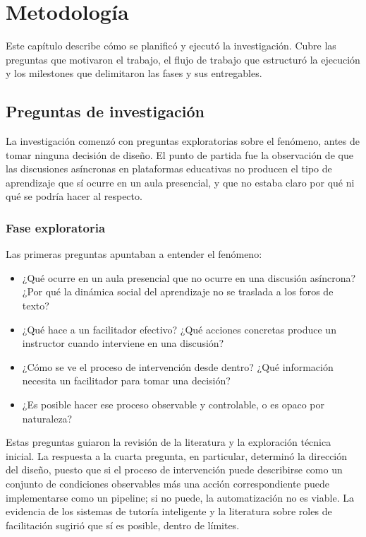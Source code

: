 \chapter{Metodología}

Este capítulo describe cómo se planificó y ejecutó la investigación. Cubre las preguntas que motivaron el trabajo, el flujo de trabajo que estructuró la ejecución y los milestones que delimitaron las fases y sus entregables.

\section{Preguntas de investigación}

La investigación comenzó con preguntas exploratorias sobre el fenómeno, antes de tomar ninguna decisión de diseño. El punto de partida fue la observación de que las discusiones asíncronas en plataformas educativas no producen el tipo de aprendizaje que sí ocurre en un aula presencial, y que no estaba claro por qué ni qué se podría hacer al respecto.

\subsection{Fase exploratoria}

Las primeras preguntas apuntaban a entender el fenómeno:

\begin{itemize}
  \item ¿Qué ocurre en un aula presencial que no ocurre en una discusión asíncrona? ¿Por qué la dinámica social del aprendizaje no se traslada a los foros de texto?
  \item ¿Qué hace a un facilitador efectivo? ¿Qué acciones concretas produce un instructor cuando interviene en una discusión?
  \item ¿Cómo se ve el proceso de intervención desde dentro? ¿Qué información necesita un facilitador para tomar una decisión?
  \item ¿Es posible hacer ese proceso observable y controlable, o es opaco por naturaleza?
\end{itemize}

Estas preguntas guiaron la revisión de la literatura y la exploración técnica inicial. La respuesta a la cuarta pregunta, en particular, determinó la dirección del diseño, puesto que si el proceso de intervención puede describirse como un conjunto de condiciones observables más una acción correspondiente puede implementarse como un pipeline; si no puede, la automatización no es viable. La evidencia de los sistemas de tutoría inteligente \autocite{VanLehn2011} y la literatura sobre roles de facilitación \autocite{PilkingtonWalker2003} sugirió que sí es posible, dentro de límites.

